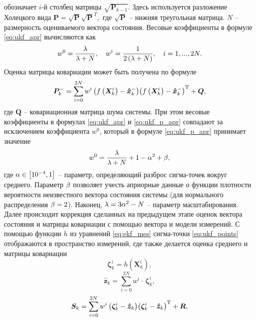 обозначает  $i$-й столбец матрицы ${\sqrt {{{\bm{P}}_{k - 1}}} }$.  Здесь используется разложение Холецкого \cite{Verbjitsky01} вида
${\bm{P}} = \sqrt {\bm{P}} {\sqrt {\bm{P}} ^T},$
где $\sqrt {\bm{P}}$ -- нижняя треугольная матрица. $N$ -- размерность оцениваемого вектора состояния. Весовые коэффициенты в формуле \eqref{eq:ukf_apr} вычисляются как
\begin{equation}
{w^0} = \frac{{\rm{\lambda }}}{{{\rm{\lambda }} + N}},
\quad
{w^i} = \frac{1}{{2\left( {{\rm{\lambda }} + N} \right)}},
\quad
i = 1,...,2N.
\end{equation}
Оценка матрицы ковариации может быть получена по формуле
\begin{equation} \label{eq:ukf_p_apr}
{\bm{P}}_k^ -  = \sum\limits_{i = 0}^{2N} {{w^i}\left( {f\left( {{\bm{X}}_k^i} \right) - {\bm{\hat x}}_k^ - } \right)} {\left( {f\left( {{\bm{X}}_k^i} \right) - {\bm{\hat x}}_k^ - } \right)^{\rm{T}}} + {\bm{Q}},
\end{equation}
где $\bm{Q}$ -- ковариационная матрица шума системы.
При этом весовые коэффициенты в формулах \eqref{eq:ukf_apr} и \eqref{eq:ukf_p_apr} совпадают за исключением коэффициента  ${w^0}$, который в формуле \eqref{eq:ukf_p_apr} принимает значение \cite{Kulikova01}
\begin{equation}
w^0 = \frac{{\rm{\lambda }}}{{{\rm{\lambda }} + N}} + 1 - {{\rm{\alpha }}^2} + {\rm{\beta }},
\end{equation}
где
${\rm{\alpha }} \in \left[ {{{10}^{ - 4}},1} \right]$
-- параметр, определяющий разброс сигма-точек вокруг среднего.
Параметр ${\rm{\beta }}$  позволяет учесть априорные данные о функции плотности вероятности неизвестного вектора состояния системы (для нормального распределения  ${\rm{\beta }} = 2$). Наконец, ${\rm{\lambda }} = 3{{\rm{\alpha }}^2} - N$ -- параметр масштабирования.
Далее происходит коррекция сделанных на предыдущем этапе оценок вектора состояния и матрицы ковариации с помощью вектора и модели измерений.
С помощью функции $h$ из уравнений \eqref{eq:ekf_mes} сигма-точки \eqref{eq:ukf_points} отображаются в пространство измерений, где также делается оценка среднего и матрицы ковариации
\begin{equation}
{\bm{\zeta }}_k^i = h\left( {{\bm{X}}_k^i} \right),
\end{equation}
\begin{equation}
{{{\bm{\hat z}}}_k} = \sum\limits_{i = 0}^{2N} {{w^i} \cdot } \,{\bm{\zeta }}_k^i,
\end{equation}
\begin{equation}
{{\bm{S}}_k} = \sum\limits_{i = 0}^{2N} {{w^i}\left( {{\bm{\zeta }}_k^i - {{{\bm{\hat z}}}_k}} \right)} {\left( {{\bm{\zeta }}_k^i - {{{\bm{\hat z}}}_k}} \right)^{\rm{T}}} + {\bm{R}},
\end{equation}
